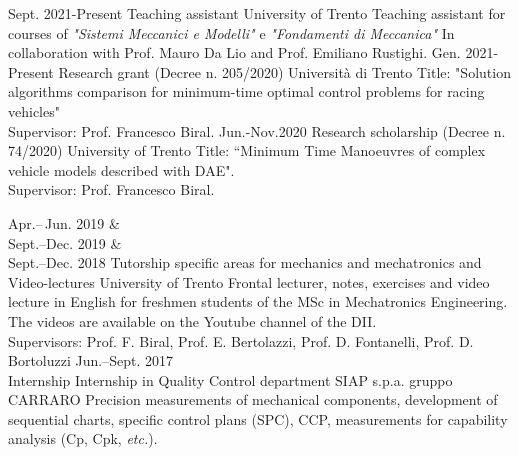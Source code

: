 \documentclass[9pt]{developercv_mattia} %
\begin{document}
\begin{entrylist}
	\entry
		{Sept. 2021-Present}
		{Teaching assistant}
		{University of Trento}
		{Teaching assistant for courses of \textit{"Sistemi Meccanici e Modelli"} e \textit{"Fondamenti di Meccanica"} In collaboration with Prof. Mauro Da Lio and Prof. Emiliano Rustighi.}
	\entry
		{Gen. 2021-Present}
		{Research grant (Decree n. 205/2020)}
		{Università di Trento}
		{Title: "Solution algorithms comparison for minimum-time optimal control problems for racing vehicles"\\
		Supervisor: Prof. Francesco Biral.}
	\entry
		{Jun.-Nov.2020}
		{Research scholarship (Decree n. 74/2020)}
		{University of Trento}
		{Title: “Minimum Time Manoeuvres of complex vehicle models described with DAE".\\ 
		Supervisor: Prof. Francesco Biral.}

	\entry
		{Apr.\;\;--\,Jun. 2019 \&\\Sept.--Dec. 2019 \&\\Sept.--Dec. 2018}
		{Tutorship specific areas for mechanics and mechatronics and Video-lectures}
		{University of Trento}
		{Frontal lecturer, notes, exercises and video lecture in English for freshmen students of the MSc in Mechatronics Engineering. The videos are available on the Youtube channel of the DII.\\
		Supervisors: Prof. F. Biral, Prof. E. Bertolazzi, Prof. D. Fontanelli, Prof. D. Bortoluzzi}
	\entry
		{Jun.--Sept. 2017\\\footnotesize{Internship}}
		{Internship in Quality Control department}
		{SIAP s.p.a. gruppo CARRARO}
		{Precision measurements of mechanical components, development of sequential charts, specific control plans (SPC), CCP, measurements for capability analysis (Cp, Cpk, \textit{etc.}).
		}
\end{entrylist}
\end{document}
